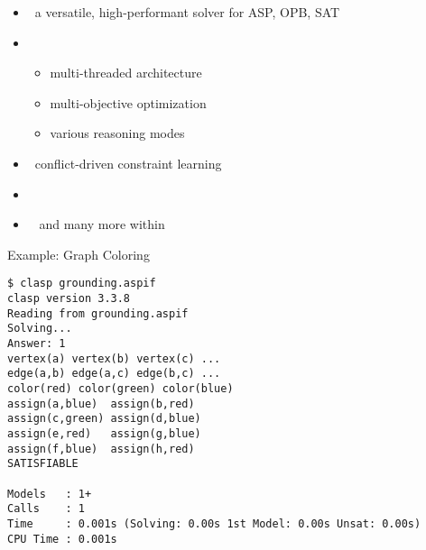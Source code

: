 \begin{frame}{\clasp}
  \begin{itemize}
  \item {} \ a versatile, high-performant solver for ASP, OPB, SAT
  \item {}
    \begin{itemize}
    \item multi-threaded architecture
    \item multi-objective optimization
    \item various reasoning modes
    \end{itemize}
  \item {}   \  conflict-driven constraint learning
  \item {}   \ \cite{gekasc09c,gekasc12b,gekakasc12a}
  \item {} \ \cite{nefrle18a} and many more within \clingo
  \end{itemize}
\end{frame}

\begin{frame}[fragile,shrink=1]{Example: Graph Coloring}
\begin{lstlisting}
$ clasp grounding.aspif
clasp version 3.3.8
Reading from grounding.aspif
Solving...
Answer: 1
vertex(a) vertex(b) vertex(c) ...
edge(a,b) edge(a,c) edge(b,c) ...
color(red) color(green) color(blue)
assign(a,blue)  assign(b,red)
assign(c,green) assign(d,blue)
assign(e,red)   assign(g,blue)
assign(f,blue)  assign(h,red)
SATISFIABLE

Models   : 1+
Calls    : 1
Time     : 0.001s (Solving: 0.00s 1st Model: 0.00s Unsat: 0.00s)
CPU Time : 0.001s
\end{lstlisting}
\end{frame}

%
